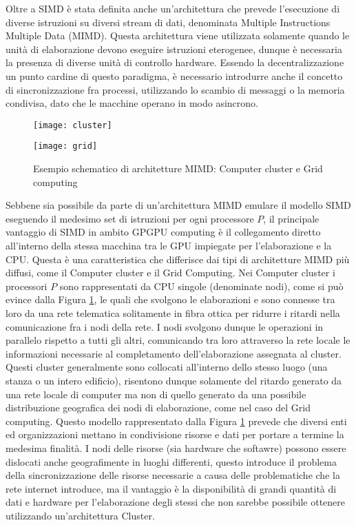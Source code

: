 Oltre a SIMD è stata definita anche un'architettura che prevede
l'esecuzione di diverse istruzioni su diversi stream di dati, denominata
Multiple Instructions Multiple Data (MIMD)\cite{duncan1990survey}.
Questa architettura viene utilizzata solamente quando le unità di elaborazione
devono eseguire istruzioni eterogenee, dunque è necessaria la presenza
di diverse unità di controllo hardware.
Essendo la decentralizzazione un punto cardine
di questo paradigma, è necessario introdurre anche il concetto di
sincronizzazione fra processi, utilizzando lo scambio di messaggi o
la memoria condivisa, dato che le macchine operano in modo asincrono.
\begin{figure}[t]
    \begin{minipage}[b]{.5\linewidth}
        \centering
        \texttt{[image: cluster]}
    \end{minipage}
    \begin{minipage}[b]{.5\linewidth}
        \centering
        \texttt{[image: grid]}
    \end{minipage}
    \caption{Esempio schematico di architetture MIMD:
        Computer cluster e Grid computing}
    \label{fig:cluster-grid}
\end{figure}
Sebbene sia possibile da parte di un'architettura MIMD emulare il modello
SIMD eseguendo il medesimo set di istruzioni per ogni processore $P$, il
principale vantaggio di SIMD in ambito GPGPU computing è il collegamento diretto
all'interno della stessa macchina tra le GPU impiegate per l'elaborazione e la 
CPU. Questa è una caratteristica che differisce dai tipi di
architetture MIMD più diffusi, come il Computer cluster e il Grid Computing.
Nei Computer cluster i processori $P$ sono rappresentati da CPU singole
(denominate nodi), come si può evince dalla Figura \ref{fig:cluster-grid},
le quali che svolgono le elaborazioni e sono connesse tra loro da una
rete telematica solitamente in fibra
ottica per ridurre i ritardi nella comunicazione fra i nodi della rete.
I nodi svolgono dunque le operazioni in parallelo rispetto a tutti gli altri,
comunicando tra loro attraverso la rete locale le informazioni necessarie al
completamento dell'elaborazione assegnata al cluster. Questi cluster
generalmente sono collocati all'interno dello stesso luogo
(una stanza o un intero edificio), risentono dunque solamente del ritardo generato
da una rete locale di computer ma non di quello generato da una
possibile distribuzione geografica dei nodi di elaborazione, come nel caso
del Grid computing. Questo modello rappresentato dalla Figura
\ref{fig:cluster-grid} 
prevede che diversi enti ed organizzazioni mettano in condivisione risorse e
dati per portare a termine la medesima finalità.
I nodi delle risorse (sia hardware che softawre) possono essere
dislocati anche geografimente in luoghi differenti, questo introduce il problema
della sincronizzazione delle risorse necessarie a causa delle problematiche
che la rete internet introduce, ma il vantaggio è la disponibilità di grandi
quantità di dati e hardware per l'elaborazione degli stessi che non sarebbe
possibile ottenere utilizzando un'architettura Cluster.

